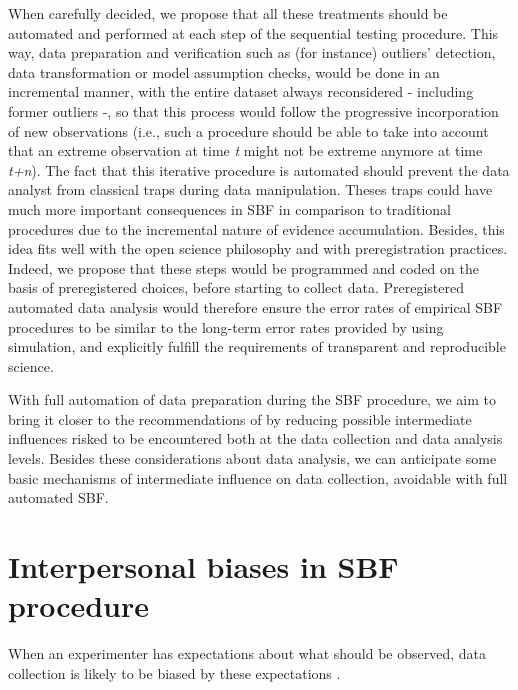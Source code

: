 \documentclass[a4paper,man,natbib,floatsintext,donotrepeattitle]{apa6}
\begin{document}
When carefully decided, we propose that all these treatments should be automated and performed at each step of the sequential testing procedure. This way,  data preparation and verification such as (for instance) outliers' detection, data transformation or model assumption checks, would be done in an incremental manner, with the entire dataset always reconsidered - including former outliers -, so that this process would follow the progressive incorporation of new observations (i.e., such a procedure should be able to take into account that an extreme observation at time \textit{t} might not be extreme anymore at time \textit{t+n}). The fact that this iterative procedure is automated should prevent the data analyst from classical traps during data manipulation. Theses traps could have much more important consequences in SBF in comparison to traditional procedures due to the incremental nature of evidence accumulation. Besides, this idea fits well with the open science philosophy and with preregistration practices. Indeed, we propose that these steps would be programmed and coded on the basis of preregistered choices, before starting to collect data. Preregistered automated data analysis would therefore ensure the error rates of empirical SBF procedures to be similar to the long-term error rates provided by \cite{schonbrodt_sequential_2017} using simulation, and explicitly fulfill the requirements of transparent and reproducible science. \par

With full automation of data preparation during the SBF procedure, we aim to bring it closer to the recommendations of \cite{schonbrodt_sequential_2017} by reducing possible intermediate influences risked to be encountered both at the data collection and data analysis levels. Besides these considerations about data analysis, we can anticipate some basic mechanisms of intermediate influence on data collection, avoidable with full automated SBF.

\section{Interpersonal biases in SBF procedure}

When an experimenter has expectations about what should be observed, data collection is likely to be biased by these expectations \citep{orne_social_1962,rosenthal_social_1963,rosenthal_experimenter_1964,rosenthal_interpersonal_1978,zoble_interaction_1969,klein_low_2012,gilder_role_2018}.
\end{document}
